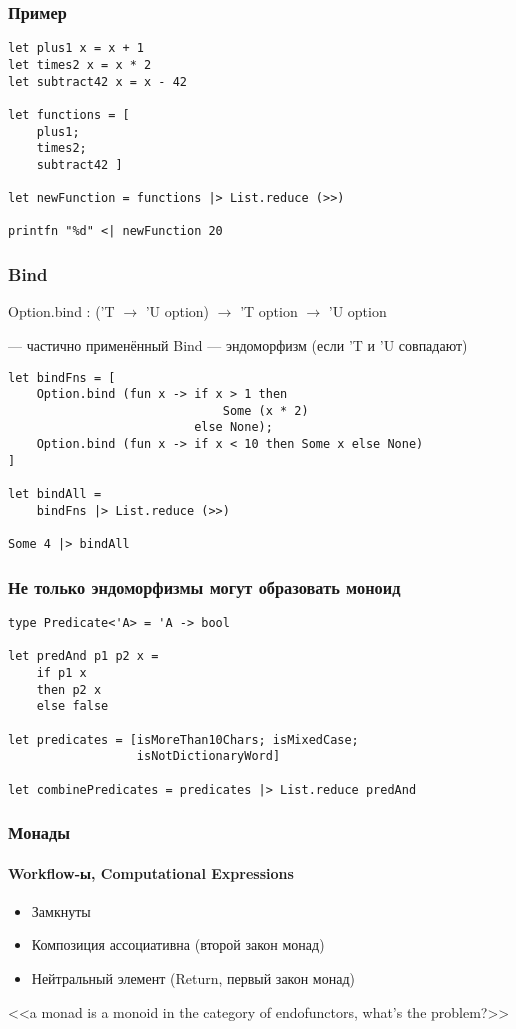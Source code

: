 \documentclass[xetex,mathserif,serif]{beamer}
\begin{document}
    \begin{frame}[fragile]
        \frametitle{Пример}
        \begin{verbatim}
let plus1 x = x + 1
let times2 x = x * 2
let subtract42 x = x - 42

let functions = [
    plus1;
    times2;
    subtract42 ]

let newFunction = functions |> List.reduce (>>)

printfn "%d" <| newFunction 20
        \end{verbatim}
    \end{frame}

    \begin{frame}[fragile]
        \frametitle{Bind}
        Option.bind : ('T $\to$ 'U option) $\to$ 'T option $\to$ 'U option

        --- частично применённый Bind --- эндоморфизм (если 'T и 'U совпадают)
        \begin{verbatim}
let bindFns = [
    Option.bind (fun x -> if x > 1 then 
                              Some (x * 2) 
                          else None);
    Option.bind (fun x -> if x < 10 then Some x else None)
]

let bindAll = 
    bindFns |> List.reduce (>>)

Some 4 |> bindAll
        \end{verbatim}
    \end{frame}

    \begin{frame}[fragile]
        \frametitle{Не только эндоморфизмы могут образовать моноид}
        \begin{verbatim}
type Predicate<'A> = 'A -> bool

let predAnd p1 p2 x = 
    if p1 x 
    then p2 x
    else false

let predicates = [isMoreThan10Chars; isMixedCase; 
                  isNotDictionaryWord]

let combinePredicates = predicates |> List.reduce predAnd
        \end{verbatim}
    \end{frame}

    \begin{frame}
        \frametitle{Монады}
        \framesubtitle{Workflow-ы, Computational Expressions}
        \begin{itemize}
            \item Замкнуты
            \item Композиция ассоциативна (второй закон монад)
            \item Нейтральный элемент (Return, первый закон монад)
        \end{itemize}
        <<a monad is a monoid in the category of endofunctors, what's the problem?>>
    \end{frame}
\end{document}
